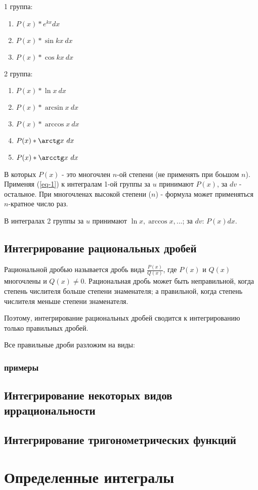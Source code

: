 \documentclass[12pt,a4paper]{article}
\begin{document}
1 группа:
\begin{enumerate}[leftmargin=*, itemsep=0.4ex, before={\everymath{\displaystyle}}]%
\item{$P(x) * e^{kx} dx$}
\item{$P(x) * \sin kx\ dx$}
\item{$P(x) * \cos kx\ dx$}
\end{enumerate}

2 группа:
\begin{enumerate}[leftmargin=*, itemsep=0.4ex, before={\everymath{\displaystyle}}]%
\item{$P(x) * \ln x\ dx$}
\item{$P(x) * \arcsin x\ dx$}
\item{$P(x) * \arccos x\ dx$}
\item{$P(x) * \arctg x\ dx$}
\item{$P(x) * \arcctg x\ dx$}
\end{enumerate}

В которых $P(x)$ - это многочлен $n$-ой степени (не применять при
боьшом $n$).
Применяя (\ref{eq-1}) к интегралам 1-ой группы за $u$ принимают
$P(x)$, за $dv$ - остальное.
При многочленах высокой степени ($n$) - формула может
применяться $n$-кратное число раз.

В интегралах 2 группы за $u$ принимают $\ln x, \arccos x,...$;
за $dv$: $P(x) dx$.
\subsection{Интегрирование рациональных дробей}
Рациональной дробью называется дробь вида $\frac{P(x)}{Q(x)}$, где
$P(x)$ и $Q(x)$ многочлены и $Q(x) \neq 0$.
Рациональная дробь может быть неправильной, когда степень числителя
больше степени знаменателя; а правильной, когда степень
числителя меньше степени знаменателя.

Поэтому, интегрирование рациональных дробей сводится к
интегрированию только правильных дробей.

Все правильные дроби разложим на виды:

\subsubsection{примеры}
\subsection{Интегрирование некоторых видов иррациональности}
\subsection{Интегрирование тригонометрических функций}
\section{Определенные интегралы}
\end{document}

